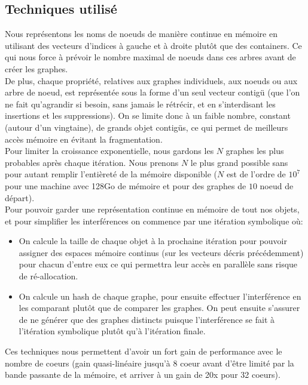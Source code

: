 \documentclass[11pts,french]{article}
\begin{document}
\subsection{ Techniques utilisé }

Nous représentons les noms de noeuds de manière continue en mémoire en utilisant des vecteurs d'indices à gauche et à droite plutôt que des containers. Ce qui nous force à prévoir le nombre maximal de noeuds dans ces arbres avant de créer les graphes.  \\

De plus, chaque propriété, relatives aux graphes individuels, aux noeuds ou aux arbre de noeud, est représentée sous la forme d'un seul vecteur contig\"u (que l'on ne fait qu'agrandir si besoin, sans jamais le rétrécir, et en s'interdisant les insertions et les suppressions). On se limite donc à un faible nombre, constant (autour d'un vingtaine), de grands objet contig\"us, ce qui permet de meilleurs accès mémoire en évitant la fragmentation. \\

Pour limiter la croissance exponentielle, nous gardons les $N$ graphes les plus probables après chaque itération. Nous prenons $N$ le plus grand possible sans pour autant remplir l'entièreté de la mémoire disponible ($N$ est de l'ordre de $10^{7}$ pour une machine avec 128Go de mémoire et pour des graphes de $10$ noeud de départ). \\

Pour pouvoir garder une représentation continue en mémoire de tout nos objets, et pour simplifier les interférences on commence par une itération symbolique où:

\begin{itemize}
\itemsep0em
    \item On calcule la taille de chaque objet à la prochaine itération pour pouvoir assigner des espaces mémoire continus (sur les vecteurs décris précédemment) pour chacun d'entre eux ce qui permettra leur accès en parallèle sans risque de ré-allocation.
    \item On calcule un hash de chaque graphe, pour ensuite effectuer l'interférence en les comparant plutôt que de comparer les graphes. On peut ensuite s'assurer de ne générer que des graphes distincts puisque l'interférence se fait à l'itération symbolique plutôt qu'à l'itération finale.
\end{itemize}

Ces techniques nous permettent d'avoir un fort gain de performance avec le nombre de coeurs (gain quasi-linéaire jusqu'à 8 coeur avant d'être limité par la bande passante de la mémoire, et arriver à un gain de 20x pour 32 coeurs).
\end{document}
